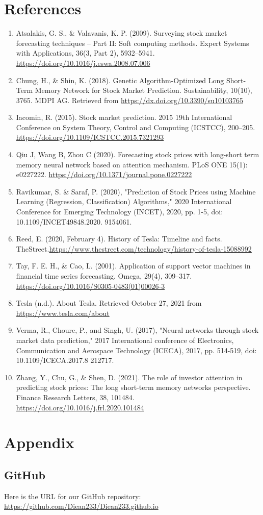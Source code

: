 \documentclass[12pt,a4paper]{article}
\begin{document}
\section*{References}
\begin{enumerate}
    \item Atsalakis, G. S., \& Valavanis, K. P. (2009). Surveying stock market forecasting techniques – Part II: Soft computing methods. Expert Systems with Applications, 36(3, Part 2), 5932–5941. \url{https://doi.org/10.1016/j.eswa.2008.07.006}
    \item Chung, H., \& Shin, K. (2018). Genetic Algorithm-Optimized Long Short-Term Memory Network for Stock Market Prediction. Sustainability, 10(10), 3765. MDPI AG. Retrieved from \url{https://dx.doi.org/10.3390/su10103765 }
    \item Iacomin, R. (2015). Stock market prediction. 2015 19th International Conference on System Theory, Control and Computing (ICSTCC), 200–205. \url{https://doi.org/10.1109/ICSTCC.2015.7321293}
    \item Qiu J, Wang B, Zhou C (2020). Forecasting stock prices with long-short term memory neural network based on attention mechanism. PLoS ONE 15(1): e0227222.  \url{https://doi.org/10.1371/journal.pone.0227222}
    \item Ravikumar, S. \& Saraf, P. (2020), "Prediction of Stock Prices using Machine Learning (Regression, Classification) Algorithms," 2020 International Conference for Emerging Technology (INCET), 2020, pp. 1-5, doi: 10.1109/INCET49848.2020.
    9154061.
    \item Reed, E. (2020, February 4). History of Tesla: Timeline and facts. TheStreet.\url{https://www.thestreet.com/technology/history-of-tesla-15088992}
    \item Tay, F. E. H., \& Cao, L. (2001). Application of support vector machines in financial time series forecasting. Omega, 29(4), 309–317.  \url{https://doi.org/10.1016/S0305-0483(01)00026-3}
    \item Tesla (n.d.). About Tesla. Retrieved October 27, 2021 from \url{https://www.tesla.com/about }
    \item Verma, R., Choure, P., and Singh, U. (2017), "Neural networks through stock market data prediction," 2017 International conference of Electronics, Communication and Aerospace Technology (ICECA), 2017, pp. 514-519, doi: 10.1109/ICECA.2017.8
    212717.
    \item Zhang, Y., Chu, G., \& Shen, D. (2021). The role of investor attention in predicting stock prices: The long short-term memory networks perspective. Finance Research Letters, 38, 101484.  \url{https://doi.org/10.1016/j.frl.2020.101484}
\end{enumerate}

\appendix
\section{Appendix}

\subsection{GitHub}

Here is the URL for our GitHub repository:\\

\url{https://github.com/Diean233/Diean233.github.io}
\end{document}
